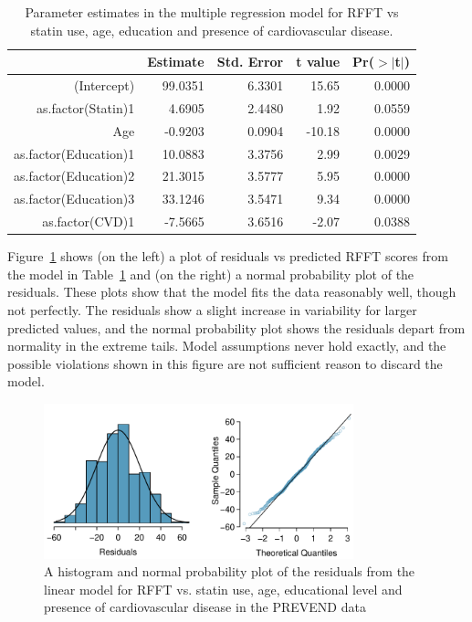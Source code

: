 \begin{table}[ht]
\centering
\begin{tabular}{rrrrr}
  \hline
 & Estimate & Std. Error & t value & Pr($>$$|$t$|$) \\ 
  \hline
(Intercept) & 99.0351 & 6.3301 & 15.65 & 0.0000 \\ 
  as.factor(Statin)1 & 4.6905 & 2.4480 & 1.92 & 0.0559 \\ 
  Age & -0.9203 & 0.0904 & -10.18 & 0.0000 \\ 
  as.factor(Education)1 & 10.0883 & 3.3756 & 2.99 & 0.0029 \\ 
  as.factor(Education)2 & 21.3015 & 3.5777 & 5.95 & 0.0000 \\ 
  as.factor(Education)3 & 33.1246 & 3.5471 & 9.34 & 0.0000 \\ 
  as.factor(CVD)1 & -7.5665 & 3.6516 & -2.07 & 0.0388 \\ 
   \hline
\end{tabular}
\caption{Parameter estimates in the multiple regression model for RFFT vs statin use, age, education and presence of cardiovascular disease.}
\label{RFFTStatinAgeEducationCVD}
\end{table}


Figure~\ref{RFFTStatinAgeEducCVDResidNormPlot} shows (on the left) a plot of residuals vs predicted RFFT scores from the model in Table~\ref{RFFTStatinAgeEducationCVD} and (on the right) a normal probability plot of the residuals.  These plots show that the model fits the data reasonably well, though not perfectly.  The residuals show a slight increase in variability for larger predicted values, and the normal probability plot shows the residuals depart from normality in the extreme tails.  Model assumptions never hold exactly, and the possible violations shown in this figure are not sufficient reason to discard the model.


\begin{figure}[h!]
	\centering
	\includegraphics[width=0.8\textwidth]
	{ch_multiple_linear_regression_oi_biostat/figures/RFFTStatinAgeEducCVDResidNormPlot/RFFTStatinAgeEducCVDResidNormPlot.pdf}
	\caption{A histogram and normal probability plot of the residuals from the linear model for RFFT vs. statin use, age, educational level and presence of cardiovascular disease in the PREVEND data}
	\label{RFFTStatinAgeEducCVDResidNormPlot}
\end{figure}

